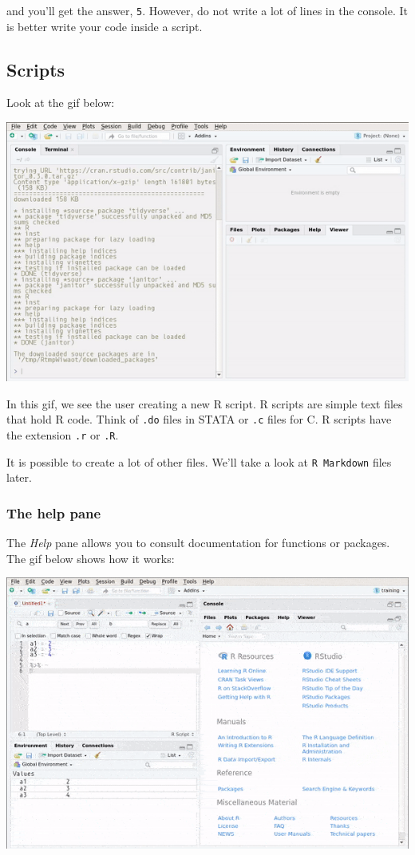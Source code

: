 \documentclass[]{gitbook}
\theoremstyle{definition}
\theoremstyle{definition}
\theoremstyle{definition}
\theoremstyle{remark}
\begin{document}
and you'll get the answer, \texttt{5}. However, do not write a lot of
lines in the console. It is better write your code inside a script.

\hypertarget{scripts}{%
\subsection{Scripts}\label{scripts}}

Look at the gif below:

\includegraphics{pics/rstudio_new_script.gif}

In this gif, we see the user creating a new R script. R scripts are
simple text files that hold R code. Think of \texttt{.do} files in STATA
or \texttt{.c} files for C. R scripts have the extension \texttt{.r} or
\texttt{.R}.

It is possible to create a lot of other files. We'll take a look at
\texttt{R\ Markdown} files later.

\hypertarget{the-help-pane}{%
\subsubsection{The help pane}\label{the-help-pane}}

The \emph{Help} pane allows you to consult documentation for functions
or packages. The gif below shows how it works:

\includegraphics{pics/rstudio_help.gif}
\end{document}
